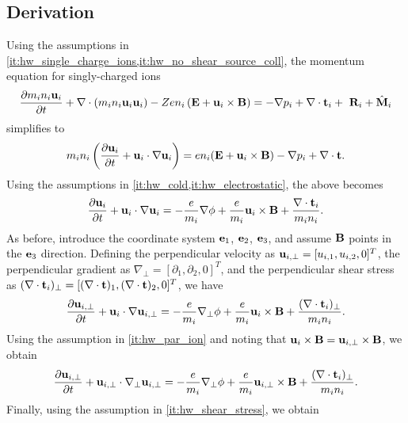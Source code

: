 \documentclass[11pt]{article}
\begin{document}
\subsection{Derivation}
Using the assumptions in \cref{it:hw_single_charge_ions,it:hw_no_shear_source_coll}, the momentum equation for singly-charged ions
\begin{equation}
    \frac{\partial m_i n_i \mathbf{u}_i}{\partial t} + \nabla \cdot \left ( m_i n_i \mathbf{u}_i \mathbf{u}_i \right ) - Z e n_i \left ( \mathbf{E} + \mathbf{u}_i \times \mathbf{B} \right ) = -\nabla p_i + \nabla \cdot \mathbf{t}_i + \ \mathbf{R}_i + \hat{\mathbf{M}}_i
\end{equation}
simplifies to
\begin{equation}
    m_i n_i \left (\frac{\partial \mathbf{u}_i}{\partial t} + \mathbf{u}_i \cdot \nabla \mathbf{u}_i \right ) = e n_i (\mathbf{E} + \mathbf{u}_i \times \mathbf{B}) - \nabla p_i + \nabla \cdot \mathbf{t}.
\end{equation}
Using the assumptions in \cref{it:hw_cold,it:hw_electrostatic}, the above becomes
\begin{equation}
    \frac{\partial \mathbf{u}_i}{\partial t} + \mathbf{u}_i \cdot \nabla \mathbf{u}_i = -\frac{e}{m_i} \nabla \phi + \frac{e}{m_i}\mathbf{u}_i \times \mathbf{B} + \frac{\nabla \cdot \mathbf{t}_i}{m_i n_i}.
\end{equation}
As before, introduce the coordinate system $\mathbf{e}_1$, $\mathbf{e}_2$, $\mathbf{e}_3$, and assume $\mathbf{B}$ points in the $\mathbf{e}_3$ direction. Defining the perpendicular velocity as $\mathbf{u}_{i,\perp} = [u_{i,1}, u_{i,2}, 0]^T$, the perpendicular gradient as $\nabla_\perp = [\partial_1, \partial_2, 0]^T$, and the perpendicular shear stress as $(\nabla \cdot \mathbf{t}_i)_\perp = [(\nabla \cdot \mathbf{t})_1, (\nabla \cdot \mathbf{t})_2, 0]^T$, we have
\begin{equation}
    \frac{\partial \mathbf{u}_{i,\perp}}{\partial t} + \mathbf{u}_i \cdot \nabla \mathbf{u}_{i,\perp} = -\frac{e}{m_i} \nabla_\perp \phi + \frac{e}{m_i}\mathbf{u}_i \times \mathbf{B} + \frac{(\nabla \cdot \mathbf{t}_i)_\perp}{m_i n_i}.
\end{equation}
Using the assumption in \cref{it:hw_par_ion} and noting that $\mathbf{u}_{i} \times \mathbf{B} = \mathbf{u}_{i,\perp} \times \mathbf{B}$, we obtain
\begin{equation}
    \frac{\partial \mathbf{u}_{i,\perp}}{\partial t} + \mathbf{u}_{i,\perp} \cdot \nabla_\perp \mathbf{u}_{i,\perp} = -\frac{e}{m_i} \nabla_\perp \phi + \frac{e}{m_i} \mathbf{u}_{i,\perp} \times \mathbf{B} + \frac{(\nabla \cdot \mathbf{t}_i)_\perp}{m_i n_i}.
\end{equation}
Finally, using the assumption in \cref{it:hw_shear_stress}, we obtain
\end{document}

